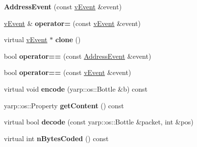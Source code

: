 \begin{DoxyCompactItemize}
\item 
{\bfseries Address\+Event} (const \hyperlink{classev_1_1vEvent}{v\+Event} \&event)\hypertarget{classev_1_1AddressEvent_acafeb45e4b444a41e7aa50c15735da14}{}\label{classev_1_1AddressEvent_acafeb45e4b444a41e7aa50c15735da14}

\item 
\hyperlink{classev_1_1vEvent}{v\+Event} \& {\bfseries operator=} (const \hyperlink{classev_1_1vEvent}{v\+Event} \&event)\hypertarget{classev_1_1AddressEvent_a2cf6648bb5f36e32e2e6ec9a952fd40a}{}\label{classev_1_1AddressEvent_a2cf6648bb5f36e32e2e6ec9a952fd40a}

\item 
virtual \hyperlink{classev_1_1vEvent}{v\+Event} $\ast$ {\bfseries clone} ()\hypertarget{classev_1_1AddressEvent_ae27d52f5a882c509541e210581530428}{}\label{classev_1_1AddressEvent_ae27d52f5a882c509541e210581530428}

\item 
bool {\bfseries operator==} (const \hyperlink{classev_1_1AddressEvent}{Address\+Event} \&event)\hypertarget{classev_1_1AddressEvent_a68943a097a59e47f627aa5ca8831e1de}{}\label{classev_1_1AddressEvent_a68943a097a59e47f627aa5ca8831e1de}

\item 
bool {\bfseries operator==} (const \hyperlink{classev_1_1vEvent}{v\+Event} \&event)\hypertarget{classev_1_1AddressEvent_ac2a1abf4ea7344ac0334216deffad02e}{}\label{classev_1_1AddressEvent_ac2a1abf4ea7344ac0334216deffad02e}

\item 
virtual void {\bfseries encode} (yarp\+::os\+::\+Bottle \&b) const \hypertarget{classev_1_1AddressEvent_a38b726cef241624c31312a3eb1f46730}{}\label{classev_1_1AddressEvent_a38b726cef241624c31312a3eb1f46730}

\item 
yarp\+::os\+::\+Property {\bfseries get\+Content} () const \hypertarget{classev_1_1AddressEvent_ad235efba4a6bd3fc79b853ecefad88c9}{}\label{classev_1_1AddressEvent_ad235efba4a6bd3fc79b853ecefad88c9}

\item 
virtual bool {\bfseries decode} (const yarp\+::os\+::\+Bottle \&packet, int \&pos)\hypertarget{classev_1_1AddressEvent_a91d805c2aeb136bb23e4da04e29d98b1}{}\label{classev_1_1AddressEvent_a91d805c2aeb136bb23e4da04e29d98b1}

\item 
virtual int {\bfseries n\+Bytes\+Coded} () const \hypertarget{classev_1_1AddressEvent_a8ffbd1a9a65ae8e0ae311201265e0fe7}{}\label{classev_1_1AddressEvent_a8ffbd1a9a65ae8e0ae311201265e0fe7}

\end{DoxyCompactItemize}
